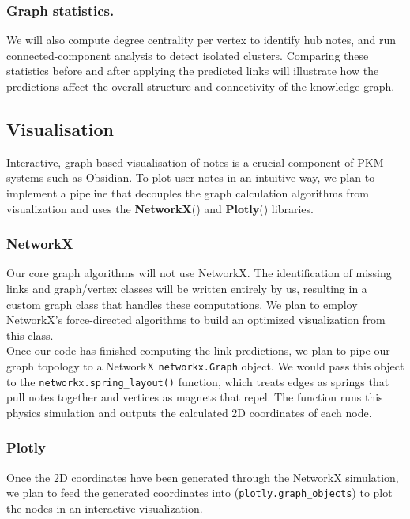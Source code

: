 \documentclass[fontsize=11pt]{article}
\begin{document}
\subsubsection*{Graph statistics.}
We will also compute degree centrality per vertex to identify hub notes, and run connected-component analysis to detect isolated clusters. Comparing these statistics before and after applying the predicted links will illustrate how the predictions affect the overall structure and connectivity of the knowledge graph.

\subsection*{Visualisation}

Interactive, graph-based visualisation of notes is a crucial component of PKM systems such as Obsidian. To plot user notes in an intuitive way, we plan to implement a pipeline that decouples the graph calculation algorithms from visualization and uses the \textbf{NetworkX}(\cite{networkx}) and \textbf{Plotly}(\cite{plotly}) libraries. 

\subsubsection*{NetworkX} 
Our core graph algorithms will not use NetworkX. The identification of missing links and graph/vertex classes will be written entirely by us, resulting in a custom graph class that handles these computations. We plan to employ NetworkX's force-directed algorithms to build an optimized visualization from this class. \\

\noindent Once our code has finished computing the link predictions, we plan to pipe our graph topology to a NetworkX \texttt{networkx.Graph} object. We would pass this object to the \texttt{networkx.spring\_layout()} function, which treats edges as springs that pull notes together and vertices as magnets that repel. The function runs this physics simulation and outputs the calculated 2D coordinates of each node. 

\subsubsection*{Plotly}
Once the 2D coordinates have been generated through the NetworkX simulation, we plan to feed the generated coordinates into (\texttt{plotly.graph\_objects}) to plot the nodes in an interactive visualization.\\
\end{document}
